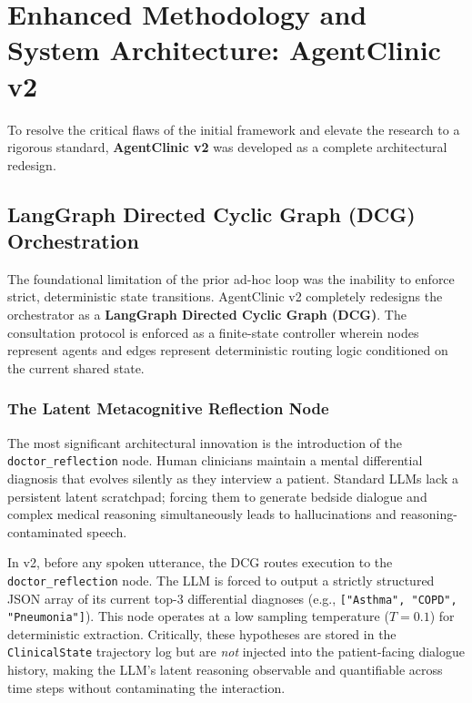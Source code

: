 \chapter{Enhanced Methodology and System Architecture: AgentClinic v2}
\label{Chapter5}

To resolve the critical flaws of the initial framework and elevate the research to a rigorous standard, \textbf{AgentClinic v2} was developed as a complete architectural redesign.

\section{LangGraph Directed Cyclic Graph (DCG) Orchestration}

The foundational limitation of the prior ad-hoc loop was the inability to enforce strict, deterministic state transitions. AgentClinic v2 completely redesigns the orchestrator as a \textbf{LangGraph Directed Cyclic Graph (DCG)}. The consultation protocol is enforced as a finite-state controller wherein nodes represent agents and edges represent deterministic routing logic conditioned on the current shared state.

\subsection{The Latent Metacognitive Reflection Node}

The most significant architectural innovation is the introduction of the \texttt{doctor\_reflection} node. Human clinicians maintain a mental differential diagnosis that evolves silently as they interview a patient. Standard LLMs lack a persistent latent scratchpad; forcing them to generate bedside dialogue and complex medical reasoning simultaneously leads to hallucinations and reasoning-contaminated speech.

In v2, before any spoken utterance, the DCG routes execution to the \texttt{doctor\_reflection} node. The LLM is forced to output a strictly structured JSON array of its current top-3 differential diagnoses (e.g., \texttt{["Asthma", "COPD", "Pneumonia"]}). This node operates at a low sampling temperature ($T=0.1$) for deterministic extraction. Critically, these hypotheses are stored in the \texttt{ClinicalState} trajectory log but are \textit{not} injected into the patient-facing dialogue history, making the LLM's latent reasoning observable and quantifiable across time steps without contaminating the interaction.

